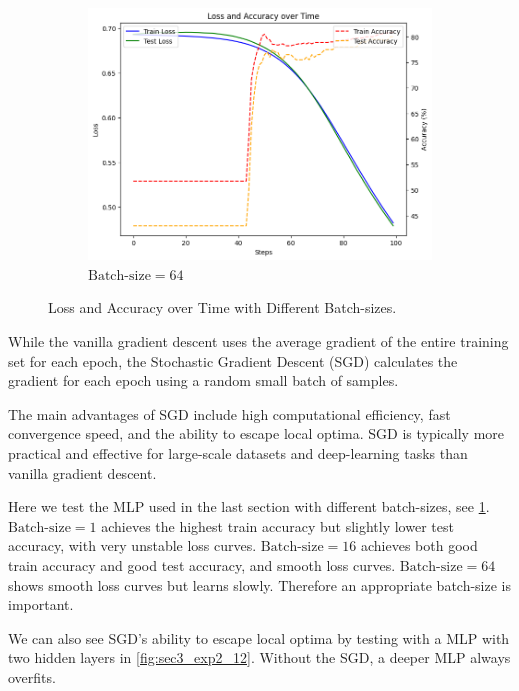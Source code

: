 \documentclass[12pt]{article}
\begin{document}
\begin{figure}[tb]
    \begin{subfigure}{0.3\textwidth}
        \includegraphics[width=\linewidth]{fig_sec3_exp3.png}
        \caption{$\text{Batch-size}=64$}
    \end{subfigure}
    \caption{Loss and Accuracy over Time with Different Batch-sizes.}
    \label{fig:sec3_exp123}
\end{figure}

While the vanilla gradient descent uses the average gradient of the entire training set for each epoch, the Stochastic Gradient Descent (SGD) calculates the gradient for each epoch using a random small batch of samples.

The main advantages of SGD include high computational efficiency, fast convergence speed, and the ability to escape local optima. SGD is typically more practical and effective for large-scale datasets and deep-learning tasks than vanilla gradient descent.

Here we test the MLP used in the last section with different batch-sizes, see \cref{fig:sec3_exp123}. $\text{Batch-size}=1$ achieves the highest train accuracy but slightly lower test accuracy, with very unstable loss curves. $\text{Batch-size}=16$ achieves both good train accuracy and good test accuracy, and smooth loss curves. $\text{Batch-size}=64$ shows smooth loss curves but learns slowly. Therefore an appropriate batch-size is important.

We can also see SGD's ability to escape local optima by testing with a MLP with two hidden layers in \cref{fig:sec3_exp2_12}. Without the SGD, a deeper MLP always overfits.
\end{document}
